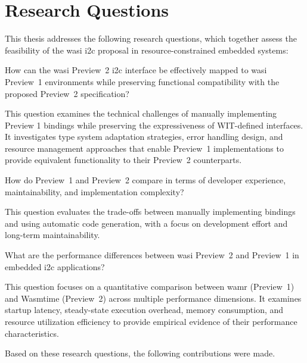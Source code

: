 \section*{Research Questions}
\label{sec:research-questions}

This thesis addresses the following research questions, which together assess the feasibility of the \acrshort{wasi} \acrshort{i2c} proposal in resource-constrained embedded systems:

\begin{researchquestion}\label{rq1}
How can the \acrshort{wasi} Preview~2 \acrshort{i2c} interface be effectively mapped to \acrshort{wasi} Preview~1 environments while preserving functional compatibility with the proposed Preview~2 specification?
\end{researchquestion}

This question examines the technical challenges of manually implementing Preview 1 bindings while preserving the expressiveness of WIT-defined interfaces. It investigates type system adaptation strategies, error handling design, and resource management approaches that enable Preview~1 implementations to provide equivalent functionality to their Preview~2 counterparts.

\begin{researchquestion}\label{rq2}
How do Preview~1 and Preview~2 compare in terms of developer experience, maintainability, and implementation complexity?
\end{researchquestion}

This question evaluates the trade-offs between manually implementing bindings and using automatic code generation, with a focus on development effort and long-term maintainability.

\begin{researchquestion}\label{rq3}
What are the performance differences between \acrshort{wasi} Preview~2 and Preview~1 in embedded \acrshort{i2c} applications?
\end{researchquestion}

This question focuses on a quantitative comparison between \acrshort{wamr} (Preview~1) and Wasmtime (Preview~2) across multiple performance dimensions. It examines startup latency, steady-state execution overhead, memory consumption, and resource utilization efficiency to provide empirical evidence of their performance characteristics.

Based on these research questions, the following contributions were made.






